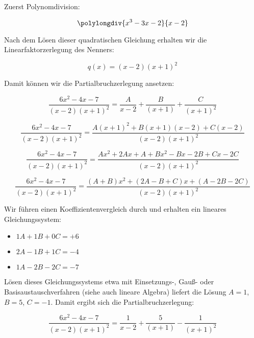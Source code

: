 \item Zuerst Polynomdivision:

\[\polylongdiv{x^3-3x-2}{x-2}\]

Nach dem Lösen dieser quadratischen Gleichung erhalten wir die Linearfaktorzerlegung des Nenners: 

$$q(x) = (x-2)(x+1)^2$$

Damit können wir die Partialbruchzerlegung ansetzen:

$$\frac{6x^2-4x-7}{(x-2)(x+1)^2} = \frac{A}{x-2}+\frac{B}{(x+1)}+\frac{C}{(x+1)^2}$$

$$\frac{6x^2-4x-7}{(x-2)(x+1)^2} = \frac{A(x+1)^2 + B(x+1)(x-2) + C(x-2)}{(x-2)(x+1)^2}$$

$$\frac{6x^2-4x-7}{(x-2)(x+1)^2} = \frac{Ax^2+2Ax+A + Bx^2-Bx-2B + Cx-2C}{(x-2)(x+1)^2}$$

$$\frac{6x^2-4x-7}{(x-2)(x+1)^2} = \frac{(A+B)x^2+(2A-B+C)x+(A-2B-2C)}{(x-2)(x+1)^2}$$

Wir führen einen Koeffizientenvergleich durch und erhalten ein lineares Gleichungssystem:

\begin{itemize}
\item $1A+1B+0C=+6$
\item $2A-1B+1C=-4$
\item $1A-2B-2C=-7$
\end{itemize}

Lösen dieses Gleichungssystems etwa mit Einsetzungs-, Gauß- oder Basisaustauschverfahren (siehe auch lineare Algebra) liefert die Lösung $A=1$, $B=5$, $C=-1$. Damit ergibt sich die Partialbruchzerlegung:

$$\frac{6x^2-4x-7}{(x-2)(x+1)^2} = \frac{1}{x-2}+\frac{5}{(x+1)}-\frac{1}{(x+1)^2}$$

